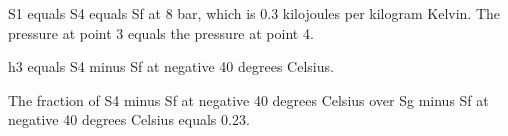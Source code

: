 S1 equals S4 equals Sf at 8 bar, which is 0.3 kilojoules per kilogram Kelvin. The pressure at point 3 equals the pressure at point 4.

h3 equals S4 minus Sf at negative 40 degrees Celsius.

The fraction of S4 minus Sf at negative 40 degrees Celsius over Sg minus Sf at negative 40 degrees Celsius equals 0.23.